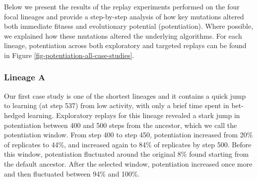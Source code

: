 Below we present the results of the replay experiments performed on the four focal lineages and provide a step-by-step analysis of how key mutations altered both immediate fitness and evolutionary potential (potentiation).
Where possible, we explained how these mutations altered the underlying algorithms.
For each lineage, potentiation across both exploratory and targeted replays can be found in Figure \ref{fig-potentiation-all-case-studies}.

\subsubsection{Lineage A}


Our first case study is one of the shortest lineages and it contains a quick jump to learning (at step 537) from low activity, with only a brief time spent in bet-hedged learning. 
Exploratory replays for this lineage revealed a stark jump in potentiation between 400 and 500 steps from the ancestor, which we call the potentiation window.
From step 400 to step 450, potentiation increased from 20\% of replicates to 44\%, and increased again to 84\% of replicates by step 500. 
Before this window, potentiation fluctuated around the original 8\% found starting from the default ancestor.
After the selected window, potentiation increased once more and then fluctuated between 94\% and 100\%. 

